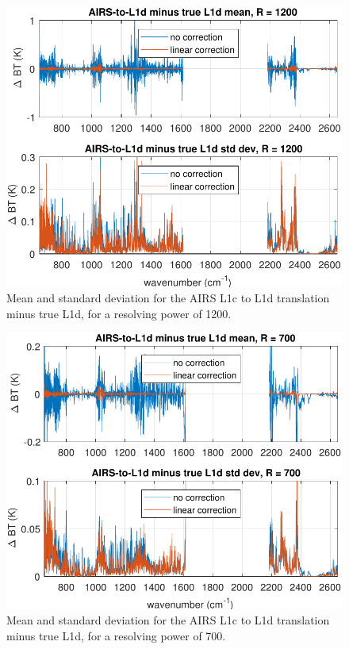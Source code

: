 \documentclass[journal]{IEEEtran}
\begin{document}
\begin{figure} %
  \centering
  \includegraphics[width=\linewidth]{figures/L1d_cor1_1200.pdf}
  \caption{Mean and standard deviation for the AIRS L1c to L1d
    translation minus true L1d, for a resolving power of 1200.}
  \label{L1d1200}
\end{figure}

\begin{figure} %
  \centering
  \includegraphics[width=\linewidth]{figures/L1d_cor1_700.pdf}
  \caption{Mean and standard deviation for the AIRS L1c to L1d
    translation minus true L1d, for a resolving power of 700.}
  \label{L1d700s}
\end{figure}
\end{document}
